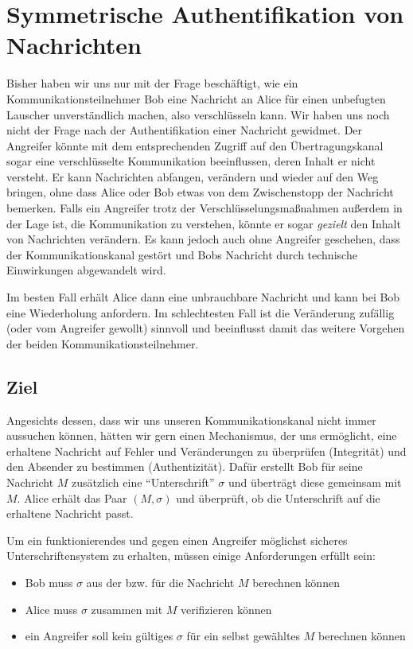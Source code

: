 \chapter{Symmetrische Authentifikation von Nachrichten}
\label{cha:symauth}

Bisher haben wir uns nur mit der Frage beschäftigt, wie ein
Kommunikationsteilnehmer Bob eine Nachricht an Alice für einen
unbefugten Lauscher unverständlich machen, also verschlüsseln kann. Wir
haben uns noch nicht der Frage nach der Authentifikation einer Nachricht
gewidmet.  Der Angreifer könnte mit dem entsprechenden Zugriff auf den
Übertragungskanal sogar eine verschlüsselte Kommunikation beeinflussen,
deren Inhalt er nicht versteht. Er kann Nachrichten abfangen, verändern
und wieder auf den Weg bringen, ohne dass Alice oder Bob etwas von dem
Zwischenstopp der Nachricht bemerken.  Falls ein Angreifer trotz der
Verschlüsselungsmaßnahmen außerdem in der Lage ist, die Kommunikation zu
verstehen, könnte er sogar \textit{gezielt} den Inhalt von Nachrichten
verändern.  Es kann jedoch auch ohne Angreifer geschehen, dass der
Kommunikationskanal gestört und Bobs Nachricht durch technische
Einwirkungen abgewandelt wird.

Im besten Fall erhält Alice dann eine unbrauchbare Nachricht und kann
bei Bob eine Wiederholung anfordern. Im schlechtesten Fall ist die
Veränderung zufällig (oder vom Angreifer gewollt) sinnvoll und
beeinflusst damit das weitere Vorgehen der beiden
Kommunikationsteilnehmer.

\section{Ziel} Angesichts dessen, dass wir uns unseren
Kommunikationskanal nicht immer aussuchen können, hätten wir gern einen
Mechanismus, der uns ermöglicht, eine erhaltene Nachricht auf Fehler und
Veränderungen zu überprüfen (Integrität) und den Absender zu bestimmen
(Authentizität). Dafür erstellt Bob für seine Nachricht $M$ zusätzlich
eine "`Unterschrift"' $\sigma$ und überträgt diese gemeinsam mit
$M$. Alice erhält das Paar $(M,\sigma)$ und überprüft, ob die
Unterschrift auf die erhaltene Nachricht passt.

Um ein funktionierendes und gegen einen Angreifer möglichst sicheres
Unterschriftensystem zu erhalten, müssen einige Anforderungen erfüllt
sein:
\begin{itemize}
\item Bob muss $\sigma$ aus der bzw. für die Nachricht $M$ berechnen
  können
\item Alice muss $\sigma$ zusammen mit $M$ verifizieren können
\item ein Angreifer soll kein gültiges $\sigma$ für ein selbst
  gewähltes $M$ berechnen können
\end{itemize}

